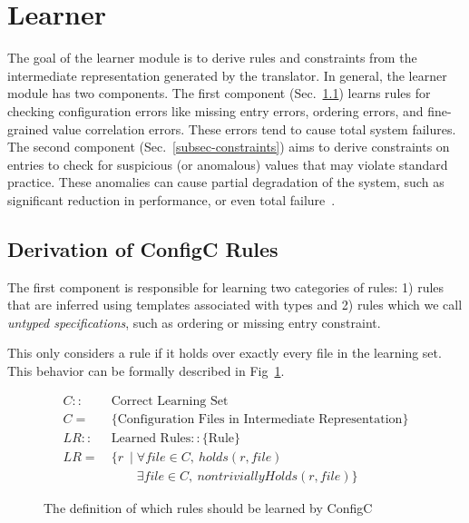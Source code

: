 \section{Learner}
\label{sec-learn}


The goal of the learner module is to derive rules and constraints from
the intermediate representation generated by the translator.
In general, the learner module has two components.
The first component (Sec.~\ref{subsec-rules}) 
learns rules for checking configuration errors like
missing entry errors, ordering errors, 
and fine-grained value correlation errors. 
These errors tend to cause total system failures.
The second component (Sec.~\ref{subsec-constraints}) aims to derive 
constraints on entries to check for suspicious (or anomalous) values 
that may violate standard practice. These anomalies can cause partial 
degradation of the system, 
such as significant reduction in performance, or even 
total failure~\cite{zhang14encore}.

\subsection{Derivation of ConfigC Rules}
\label{subsec-rules}

The first component is responsible for learning two categories of rules: 
1) rules that are inferred using templates associated with types 
and 2) rules which we call \emph{untyped specifications},
such as ordering or missing entry constraint.

This only considers a rule if it holds over exactly every file in 
the learning set. This behavior can be formally described in Fig~\ref{fig:configC}.

\begin{figure}[!h]
\begin{small}
\belowdisplayskip=-15pt
\abovedisplayskip=-2pt
\begin{align*}
C ::&\ \text{Correct Learning Set}\\
C =&\ \text{\{Configuration Files in Intermediate Representation\}}\\
LR ::&\ \text{Learned Rules} :: \{\textrm{Rule}\}\\
LR =&\ \{ r\ \mid \forall file \in C,\ holds(r,file) \\
&\qquad \ \exists file \in C,\ nontriviallyHolds(r,file)\} 
\end{align*}
\end{small}
\caption{The definition of which rules should be learned by ConfigC}
\label{fig:configC}
\end{figure}

